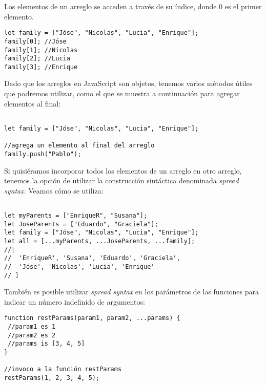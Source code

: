 \documentclass[a4paper, oneside, titlepage, 12pt]{paper}
\begin{document}
Los elementos de un arreglo se acceden a través de su índice, donde 0 es el primer elemento.

\begin{verbatim}
let family = ["Jóse", "Nicolas", "Lucia", "Enrique"];
family[0]; //Jóse
family[1]; //Nicolas
family[2]; //Lucia
family[3]; //Enrique
\end{verbatim}

Dado que los arreglos en JavaScript son objetos, tenemos varios métodos útiles que podremos utilizar, como el que se muestra a continuación para agregar elementos al final:

\begin{verbatim}

let family = ["Jóse", "Nicolas", "Lucia", "Enrique"];

//agrega un elemento al final del arreglo
family.push("Pablo");
\end{verbatim}

Si quisiéramos incorporar todos los elementos de un arreglo en otro arreglo, tenemos la opción de utilizar la construcción sintáctica denominada \textit{spread syntax}. Veamos cómo se utiliza:

\begin{verbatim}

let myParents = ["EnriqueR", "Susana"];
let JoseParents = ["Eduardo", "Graciela"];
let family = ["Jóse", "Nicolas", "Lucia", "Enrique"];
let all = [...myParents, ...JoseParents, ...family];
//[
//  'EnriqueR', 'Susana', 'Eduardo', 'Graciela', 
//  'Jóse', 'Nicolas', 'Lucia', 'Enrique'
// ]
\end{verbatim}

También es posible utilizar \textit{spread syntax} en los parámetros de las funciones para indicar un número indefinido de argumentos:

\begin{verbatim}
function restParams(param1, param2, ...params) {
 //param1 es 1	
 //param2 es 2	
 //params is [3, 4, 5]	
}

//invoco a la función restParams
restParams(1, 2, 3, 4, 5);
\end{verbatim}
\end{document}
